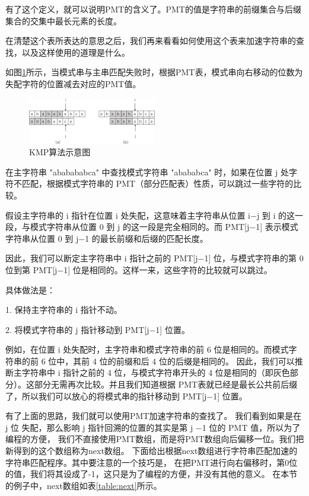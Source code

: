 \documentclass[lang=cn,newtx,10pt,scheme=chinese]{elegantbook}
\begin{document}
有了这个定义，就可以说明PMT的含义了。PMT的值是字符串的前缀集合与后缀集合的交集中最长元素的长度。


在清楚这个表所表达的意思之后，我们再来看看如何使用这个表来加速字符串的查找，以及这样使用的道理是什么。

如图\ref{fig:KMP}所示，当模式串与主串匹配失败时，根据PMT表，模式串向右移动的位数为失配字符的位置减去对应的PMT值。

\begin{figure}[h]
  \centering
  \includegraphics[width=0.5\textwidth]{./figure/pdf/cropped/KMP.pdf}
  \caption{KMP算法示意图}
  \label{fig:KMP}

\end{figure}

在主字符串 "ababababca" 中查找模式字符串 "abababca" 时，如果在位置 j 处字符不匹配，根据模式字符串的 PMT（部分匹配表）性质，可以跳过一些字符的比较。

假设主字符串的 i 指针在位置 i 处失配，这意味着主字符串从位置 i−j 到 i 的这一段，与模式字符串从位置 0 到 j 的这一段是完全相同的。而 PMT[j−1] 表示模式字符串从位置 0 到 j−1 的最长前缀和后缀的匹配长度。

因此，我们可以断定主字符串中 i 指针之前的 PMT[j−1] 位，与模式字符串的第 0 位到第 PMT[j−1] 位是相同的。这样一来，这些字符的比较就可以跳过。

具体做法是：

1. 保持主字符串的 i 指针不动。

2. 将模式字符串的 j 指针移动到 PMT[j−1] 位置。

例如，在位置 i 处失配时，主字符串和模式字符串的前 6 位是相同的。而模式字符串的前 6 位中，其前 4 位的前缀和后 4 位的后缀是相同的。
因此，我们可以推断主字符串中 i 指针之前的 4 位，与模式字符串开头的 4 位是相同的（即灰色部分）。这部分无需再次比较。并且我们知道根据
PMT表就已经是最长公共前后缀了，所以我们可以放心的将模式串的指针移动到 PMT[j−1] 位置。

有了上面的思路，我们就可以使用PMT加速字符串的查找了。
我们看到如果是在 j 位 失配，那么影响 j 指针回溯的位置的其实是第 j −1 位的 PMT 值，所以为了编程的方便， 
我们不直接使用PMT数组，而是将PMT数组向后偏移一位。我们把新得到的这个数组称为next数组。
下面给出根据next数组进行字符串匹配加速的字符串匹配程序。其中要注意的一个技巧是，
在把PMT进行向右偏移时，第0位的值，我们将其设成了-1，这只是为了编程的方便，并没有其他的意义。
在本节的例子中，next数组如表\ref{table:next}所示。
\end{document}
